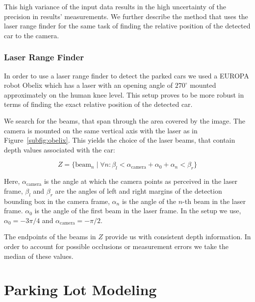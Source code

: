This high variance of the input data results in the high uncertainty of the
precision in results' measurements. We further describe the method that uses
the laser range finder for the same task of finding the relative position of
the detected car to the camera.

\subsubsection{Laser Range Finder}\label{ssub:laser_range_finder}

In order to use a laser range finder to detect the parked cars we used a
EUROPA robot Obelix which has a laser with an opening angle of $270^\circ$
mounted approximately on the human knee level. This setup proves to be more
robust in terms of finding the exact relative position of the detected car.

We search for the beams, that span through the area covered by the image. The
camera is mounted on the same vertical axis with the laser as in
Figure~\ref{subfig:obelix}. This yields the choice of the laser beams, that
contain depth values associated with the car:

\begin{equation}
Z = \{ \mathrm{beam}_n \mid \forall n : \beta_{l} < \alpha_{\mathrm{camera}} + \alpha_{0} + \alpha_{n} < \beta_{r} \}
\end{equation}

Here, $\alpha_\mathrm{camera}$ is the angle at which the camera points as perceived
in the laser frame, $\beta_{l}$ and $\beta_{r}$ are the angles of left and
right margins of the detection bounding box in the camera frame, $\alpha_{n}$
is the angle of the $n$-th beam in the laser frame. $\alpha_{0}$ is the angle
of the first beam in the laser frame. In the setup we use, $\alpha_{0} =
-3\pi/4$ and $\alpha_\mathrm{camera} = -\pi/2$.

The endpoints of the beams in $Z$ provide us with consistent depth
information. In order to account for possible occlusions or measurement errors
we take the median of these values.


\section{Parking Lot Modeling} %
\label{sec:model}

